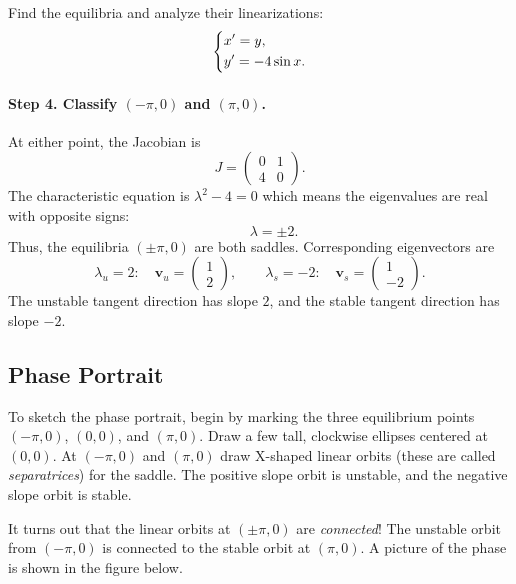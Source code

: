 \documentclass[11pt,letterpaper]{article}
\begin{document}
\begin{example}[1]{
Find the equilibria and analyze their linearizations:
\[
\begin{dcases}
x'=y,\\
y'=-4\sin x.
\end{dcases}
\]
}
\paragraph{Step 4. Classify $(-\pi,0)$ and $(\pi,0)$.}
At either point, the Jacobian is 
\[
J=
\begin{pmatrix}
0&1\\
4&0
\end{pmatrix}.
\]
The characteristic equation is $\lambda^2-4=0$ which means the eigenvalues are real with opposite signs:
$$
\qquad \lambda=\pm2.
$$
Thus, the equilibria $(\pm \pi,0)$ are both saddles. Corresponding eigenvectors are
\[
\lambda_u=2:
\quad
\mathbf{v}_u=\begin{pmatrix}1\\2\end{pmatrix},
\qquad
\lambda_s=-2:
\quad
\mathbf{v}_s=\begin{pmatrix}1\\-2\end{pmatrix}.
\]
The unstable tangent direction has slope $2$,
and the stable tangent direction has slope $-2$.
\end{example}

\subsection{Phase Portrait}

To sketch the phase portrait, begin by marking the three equilibrium points $(-\pi,0)$, $(0,0)$, and $(\pi,0)$. Draw a few tall, clockwise ellipses centered at $(0,0)$. At $(-\pi,0)$ and $(\pi,0)$ draw X-shaped  linear orbits (these are called \textit{separatrices}) for the saddle. The positive slope orbit is unstable, and the negative slope orbit is stable. 

It turns out that the linear orbits at $(\pm \pi,0)$ are \textit{connected}! The unstable orbit from $(-\pi,0)$ is connected to the stable orbit at $(\pi,0)$. A picture of the phase is shown in the figure below.
\end{document}
